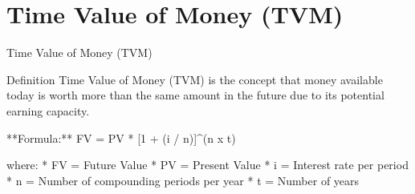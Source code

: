 \documentclass{beamer}
\begin{document}
\section{Time Value of Money (TVM)}
\begin{frame}{Time Value of Money (TVM)}
  \begin{block}{Definition}
    Time Value of Money (TVM) is the concept that money available today is worth more than the same amount in the future due to its potential earning capacity.

    **Formula:** FV = PV * [1 + (i / n)]^(n x t)

    where:
      * FV = Future Value
      * PV = Present Value
      * i = Interest rate per period
      * n = Number of compounding periods per year
      * t = Number of years
  \end{block}
\end{frame}
\end{document}
